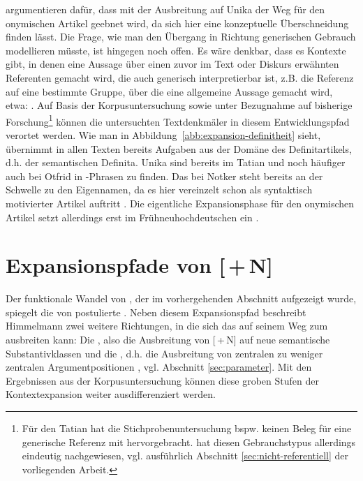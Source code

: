 \textcite[105]{Schmuck2014} argumentieren dafür, dass mit der Ausbreitung auf Unika  der Weg für den onymischen  Artikel  geebnet wird, da sich hier eine konzeptuelle Überschneidung finden lässt. Die Frage, wie man den Übergang in Richtung generischen  Gebrauch modellieren müsste, ist hingegen noch offen. Es wäre denkbar, dass es Kontexte gibt, in denen eine Aussage über einen zuvor im Text oder Diskurs erwähnten Referenten gemacht wird, die auch generisch  interpretierbar ist, z.B. die Referenz auf eine bestimmte Gruppe, über die eine allgemeine Aussage gemacht wird, etwa: . 
Auf Basis der Korpusuntersuchung  sowie unter Bezugnahme auf bisherige Forschung\footnote{Für den Tatian hat die Stichprobenuntersuchung bspw. keinen Beleg für eine generische  Referenz mit  hervorgebracht. \textcite{Oubouzar1992} hat diesen Gebrauchstypus allerdings eindeutig nachgewiesen, vgl. ausführlich Abschnitt \ref{sec:nicht-referentiell} der vorliegenden Arbeit.} können die untersuchten Textdenkmäler in diesem Entwicklungspfad verortet werden. Wie man in Abbildung~\ref{abb:expansion-definitheit} sieht, übernimmt   in allen Texten bereits Aufgaben aus der Domäne des  Definitartikels, d.h. der  semantischen Definita. Unika  sind bereits im Tatian und noch häufiger auch bei Otfrid in -Phrasen zu finden. Das  bei Notker steht bereits an der Schwelle zu den  Eigennamen, da es hier vereinzelt schon als syntaktisch motivierter Artikel auftritt \parencite[ , s.][638]{Oubouzar1989}.
Die eigentliche Expansionsphase  für den onymischen Artikel  setzt allerdings erst im Frühneuhochdeutschen ein \parencite{Schmuck2020}. 


\section{Expansionspfade von [\,+\,N]} \label{sec:disk-expansion}

Der funktionale Wandel von , der im vorhergehenden Abschnitt aufgezeigt wurde, spiegelt die von \textcite[32--33]{Himmelmann2004} postulierte  . Neben diesem Expansionspfad  beschreibt Himmelmann zwei weitere Richtungen, in die sich das  auf seinem Weg zum  ausbreiten kann: Die  , also die Ausbreitung von [\,+\,N] auf neue semantische Substantivklassen und die  , d.h. die Ausbreitung von zentralen zu weniger zentralen Argumentpositionen \parencite[32--33]{Himmelmann2004}, vgl. Abschnitt \ref{sec:parameter}. Mit den Ergebnissen aus der Korpusuntersuchung  können diese groben Stufen der Kontextexpansion  weiter ausdifferenziert werden.  

